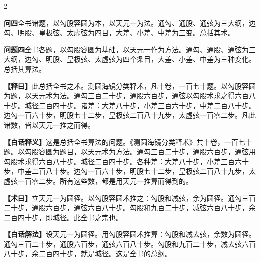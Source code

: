 \documentclass[11pt,a4paper]{article}
\newcommand{\WenQuestion}[1]{\textbf{\textcolor{classicalcolor}{#1}}}
\newcommand{\BaiQuestion}[1]{\textbf{\textcolor{moderncolor}{#1}}}
\newcommand{\WenExplain}{\textcolor{classicalcolor}{\textbf{【释曰】}}}
\newcommand{\BaiExplain}{\textcolor{moderncolor}{\textbf{【白话释义】}}}
\newcommand{\WenMethod}{\textcolor{classicalcolor}{\textbf{【术曰】}}}
\newcommand{\BaiMethod}{\textcolor{moderncolor}{\textbf{【白话解法】}}}
\begin{document}
\begin{paracol}{2}

\switchcolumn*
\begin{tcolorbox}[colback=red!3,colframe=red!30!black,boxrule=0.3pt]
\WenQuestion{问四}\quad 全书诸题，以勾股容圆为本，以天元一为法。通勾、通股、通弦为三大纲，边勾、明股、皇极弦、太虚弦为四目，大差、小差、中差为三变。总括其术。
\end{tcolorbox}
\switchcolumn
\begin{tcolorbox}[colback=blue!3,colframe=blue!30!black,boxrule=0.3pt]
\BaiQuestion{问题四}\quad 全书各题，以勾股容圆为基础，以天元一作为方法。通勾、通股、通弦为三大纲，边勾、明股、皇极弦、太虚弦为四个条目，大差、小差、中差为三种变化。总括其算法。
\end{tcolorbox}

\switchcolumn*
\begin{tcolorbox}[colback=red!5,colframe=red!30!black,boxrule=0.3pt]
\WenExplain\quad 此总括全书之术。测圆海镜分类释术，凡十卷，一百七十题。以勾股容圆为题，以天元术为法。通勾三百二十步，通股六百步，通弦以勾股术求之得六百八十步。城径二百四十步。诸差：大差八十步，小差三百六十步，中差二百八十步。边勾一百六十步，明股七十二步，皇极弦二百八十九步，太虚弦一百零二步。凡此诸数，皆以天元一推之而得。
\end{tcolorbox}
\switchcolumn
\begin{tcolorbox}[colback=blue!5,colframe=blue!30!black,boxrule=0.3pt]
\BaiExplain\quad 这是总括全书算法的问题。《测圆海镜分类释术》共十卷，一百七十题。以勾股容圆为题目，以天元术为方法。通勾三百二十步，通股六百步，通弦用勾股术求得六百八十步。城径二百四十步。各种差：大差八十步，小差三百六十步，中差二百八十步。边勾一百六十步，明股七十二步，皇极弦二百八十九步，太虚弦一百零二步。所有这些数，都是用天元一推算而得到的。
\end{tcolorbox}

\switchcolumn*
\begin{tcolorbox}[colback=red!5,colframe=red!40!black,boxrule=0.3pt]
\WenMethod\quad 立天元一为圆径。以勾股容圆术推之：勾股和减弦，余为圆径。通勾三百二十步，通股六百步，通弦六百八十步。勾股和九百二十步，减弦六百八十步，余二百四十步，即城径。此全书之宗也。
\end{tcolorbox}
\switchcolumn
\begin{tcolorbox}[colback=blue!5,colframe=blue!40!black,boxrule=0.3pt]
\BaiMethod\quad 设天元一为圆径。用勾股容圆术推算：勾股和减去弦，余数为圆径。通勾三百二十步，通股六百步，通弦六百八十步。勾股和九百二十步，减去弦六百八十步，余二百四十步，就是城径。这是全书的总纲。
\end{tcolorbox}

\end{paracol}
\end{document}
